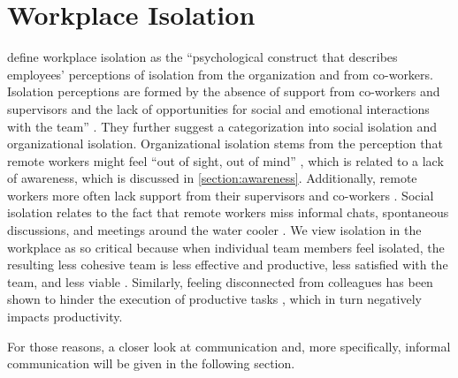 \section{Workplace Isolation}
\citeauthor{marshall2007workplace} define workplace isolation as the \enquote{psychological construct that describes employees’ perceptions of isolation from the organization and from co-workers. Isolation perceptions are formed by the absence of support from co-workers and supervisors and the lack of opportunities for social and emotional interactions with the team} \autocite[p.~198]{marshall2007workplace}. They further suggest a categorization into social isolation and organizational isolation. Organizational isolation stems from the perception that remote workers might feel \enquote{out of sight, out of mind} \autocite{bailey1999advantages}, which is related to a lack of awareness, which is discussed in \autoref{section:awareness}. Additionally, remote workers more often lack support from their supervisors and co-workers \autocite{marshall2007workplace}. Social isolation relates to the fact that remote workers miss informal chats, spontaneous discussions, and meetings around the water cooler \autocite{cooper2002telecommuting}. We view isolation in the workplace as so critical because when individual team members feel isolated, the resulting less cohesive team is less effective and productive, less satisfied with the team, and less viable \autocite{tekleab2009longitudinal, carlson2017virtual}. Similarly, feeling disconnected from colleagues has been shown to hinder the execution of productive tasks \autocite{lostFocus2020}, which in turn negatively impacts productivity.

For those reasons, a closer look at communication and, more specifically, informal communication will be given in the following section.

